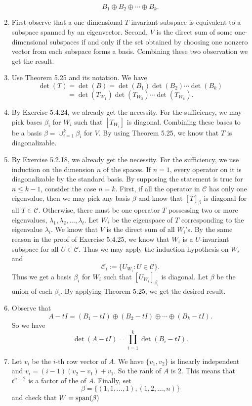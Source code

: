 \begin{enumerate}
\[B_1\oplus B_2\oplus \cdots \oplus B_k.\]
\item First observe that a one-dimensional $T$-invariant subspace is equivalent to a subspace spanned by an eigenvector. Second, $V$ is the direct sum of some one-dimensional subspaces if and only if the set obtained by choosing one nonzero vector from each subspace forms a basis. Combining these two observation we get the result.
\item Use Theorem 5.25 and its notation. We have 
\[\det(T)=\det(B)=\det(B_1)\det(B_2)\cdots \det(B_k)\]
\[=\det(T_{W_1})\det(T_{W_2})\cdots \det(T_{W_k}).\]
\item By Exercise 5.4.24, we already get the necessity. For the sufficiency, we may pick bases $\beta_i$ for $W_i$ such that $[T_{W_i}]$ is diagonal. Combining these bases to be a basis $\beta=\cup_{i=1}^k{\beta_i}$ for $V$. By using Theorem 5.25, we know that $T$ is diagonalizable.
\item By Exercise 5.2.18, we already get the necessity. For the sufficiency, we use induction on the dimension $n$ of the spaces. If $n=1$, every operator on it is diagonalizable by the standard basis. By supposing the statement is true for $n\leq k-1$, consider the case $n=k$. First, if all the operator in $\mathcal{C}$ has only one eigenvalue, then we may pick any basis $\beta$ and know that $[T]_{\beta}$ is diagonal for all $T\in \mathcal{C}$. Otherwise, there must be one operator $T$ possessing two or more eigenvalues, $\lambda_1,\lambda_2,\ldots ,\lambda_t$. Let $W_i$ be the eigenspace of $T$ corresponding to the eigenvalue $\lambda_i$. We know that $V$ is the direct sum of all $W_i$'s. By the same reason in the proof of Exercise 5.4.25, we know that $W_i$ is a $U$-invariant subspace for all $U\in \mathcal{C}$. Thus we may apply the induction hypothesis on $W_i$ and 
\[\mathcal{C}_i:=\{U_{W_i}:U\in \mathcal{C}\}.\]
Thus we get a basis $\beta_i$ for $W_i$ such that $[U_{W_i}]_{\beta_i}$ is diagonal. Let $\beta$ be the union of each $\beta_i$. By applying Theorem 5.25, we get the desired result.
\item Observe that 
\[A-tI=(B_1-tI)\oplus (B_2-tI)\oplus \cdots \oplus (B_k-tI).\]
So we have 
\[\det(A-tI)=\prod_{i=1}^k{\det(B_i-tI)}.\]
\item Let $v_i$ be the $i$-th row vector of $A$. We have $\{v_1,v_2\}$ is linearly independent and $v_i=(i-1)(v_2-v_1)+v_1$. So the rank of $A$ is $2$. This means that $t^{n-2}$ is a factor of the \charpoly{} of $A$. Finally, set 
\[\beta=\{(1,1,\ldots ,1),(1,2,\ldots ,n)\}\]
and check that $W=\sp(\beta)$

\end{enumerate}
